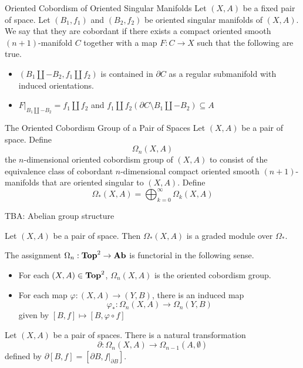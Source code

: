 \documentclass[a4paper]{article}
\begin{document}
\begin{defn}{Oriented Cobordism of Oriented Singular Manifolds}{} Let $(X,A)$ be a fixed pair of space. Let $(B_1,f_1)$ and $(B_2,f_2)$ be oriented singular manifolds of $(X,A)$. We say that they are cobordant if there exists a compact oriented smooth $(n+1)$-manifold $C$ together with a map $F:C\to X$ such that the following are true. 
\begin{itemize}
\item $(B_1\coprod-B_2,f_1\coprod f_2)$ is contained in $\partial C$ as a regular submanifold with induced orientations. 
\item $F|_{B_1\coprod-B_2}=f_1\coprod f_2$ and $f_1\coprod f_2(\partial C\setminus B_1\coprod-B_2)\subseteq A$
\end{itemize}
\end{defn}

\begin{defn}{The Oriented Cobordism Group of a Pair of Spaces}{} Let $(X,A)$ be a pair of space. Define $$\Omega_n(X,A)$$ the $n$-dimensional oriented cobordism group of $(X,A)$ to consist of the equivalence class of cobordant $n$-dimensional compact oriented smooth $(n+1)$-manifolds that are oriented singular to $(X,A)$. Define $$\Omega_\ast(X,A)=\bigoplus_{k=0}^\infty\Omega_k(X,A)$$
\end{defn}

TBA: Abelian group structure

\begin{prp}{}{} Let $(X,A)$ be a pair of space. Then $\Omega_\ast(X,A)$ is a graded module over $\Omega_\ast$. 
\end{prp}

\begin{thm}{}{} The assignment $\Omega_n:\bold{Top}^2\to\bold{Ab}$ is functorial in the following sense. 
\begin{itemize}
\item For each $(X,A)\in\bold{Top}^2$, $\Omega_n(X,A)$ is the oriented cobordism group. 
\item For each map $\varphi:(X,A)\to(Y,B)$, there is an induced map $$\varphi_\ast:\Omega_n(X,A)\to\Omega_n(Y,B)$$ given by $[B,f]\mapsto[B,\varphi\circ f]$
\end{itemize}
\end{thm}

\begin{thm}{}{} Let $(X,A)$ be a pair of spaces. There is a natural transformation $$\partial:\Omega_n(X,A)\to\Omega_{n-1}(A,\emptyset)$$ defined by $\partial[B,f]=[\partial B,f|_{\partial B}]$. 
\end{thm}
\end{document}
